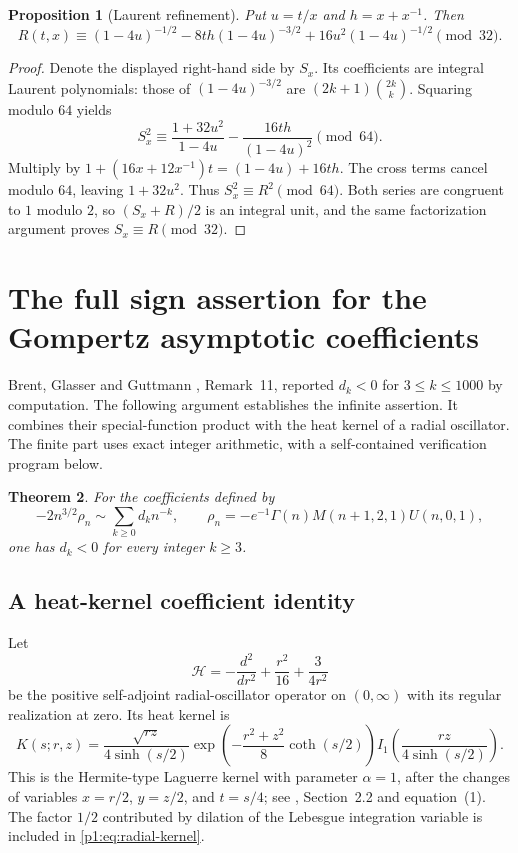 \documentclass[11pt,a4paper]{article}
\newtheorem{theorem}{Theorem}[section]
\newtheorem{proposition}[theorem]{Proposition}
\theoremstyle{definition}
\theoremstyle{remark}
\numberwithin{equation}{section}
\begin{document}
\begin{proposition}[Laurent refinement]
Put $u=t/x$ and $h=x+x^{-1}$. Then
\[
 R(t,x)\equiv(1-4u)^{-1/2}
 -8th(1-4u)^{-3/2}
 +16u^2(1-4u)^{-1/2}\pmod{32}.
\]
\end{proposition}
\begin{proof}
Denote the displayed right-hand side by $S_x$. Its coefficients are
integral Laurent polynomials: those of $(1-4u)^{-3/2}$ are
$(2k+1)\binom{2k}{k}$. Squaring modulo $64$ yields
\[
 S_x^2\equiv
 \frac{1+32u^2}{1-4u}-\frac{16th}{(1-4u)^2}\pmod{64}.
\]
Multiply by
$1+(16x+12x^{-1})t=(1-4u)+16th$.
The cross terms cancel modulo $64$, leaving $1+32u^2$.
Thus $S_x^2\equiv R^2\pmod{64}$. Both series are congruent to $1$
modulo $2$, so $(S_x+R)/2$ is an integral unit, and the same
factorization argument proves $S_x\equiv R\pmod{32}$.
\end{proof}


\section{The full sign assertion for the Gompertz asymptotic coefficients}
\label{p1:sec:bgg-sign}

Brent, Glasser and Guttmann \cite{p1:BrentGlasserGuttmann2019}, Remark~11,
reported $d_k<0$ for $3\leq k\leq1000$ by computation. The following
argument establishes the infinite assertion. It combines their
special-function product with the heat kernel of a radial oscillator.
The finite part uses exact integer arithmetic, with a self-contained
verification program below.

\begin{theorem}\label{p1:thm:bgg-sign}
For the coefficients defined by
\[
 -2n^{3/2}\rho_n\sim\sum_{k\geq0}d_kn^{-k},\qquad
 \rho_n=-e^{-1}\Gamma(n)M(n+1,2,1)U(n,0,1),
\]
one has $d_k<0$ for every integer $k\geq3$.
\end{theorem}

\subsection{A heat-kernel coefficient identity}

Let
\[
 \mathscr H=-\frac{d^2}{dr^2}+\frac{r^2}{16}+\frac3{4r^2}
\]
be the positive self-adjoint radial-oscillator operator on $(0,\infty)$
with its regular realization at zero. Its heat kernel is
\begin{equation}\label{p1:eq:radial-kernel}
 K(s;r,z)=\frac{\sqrt{rz}}{4\sinh(s/2)}
 \exp\left(-\frac{r^2+z^2}{8}\coth(s/2)\right)
 I_1\left(\frac{rz}{4\sinh(s/2)}\right).
\end{equation}
This is the Hermite-type Laguerre kernel with parameter $\alpha=1$,
after the changes of variables $x=r/2$, $y=z/2$, and $t=s/4$;
see \cite{p1:NowakStempak2016}, Section~2.2 and equation~(1).
The factor $1/2$ contributed by dilation of the Lebesgue integration
variable is included in \eqref{p1:eq:radial-kernel}.
\end{document}
